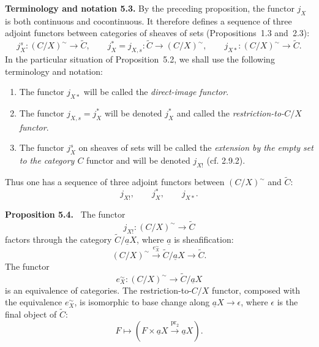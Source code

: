 \documentclass[11pt]{article}
\newcommand{\pr}{\operatorname{pr}}
\newenvironment{statement}[1]{\par\medskip\noindent\textbf{#1.}\ }{\par\medskip}
\begin{document}
\noindent\textbf{Terminology and notation 5.3.}
By the preceding proposition, the functor \(j_X\) is both continuous and cocontinuous. It therefore defines a sequence of three adjoint functors between categories of sheaves of sets (Propositions~1.3 and~2.3):
\[
j_X^s:(C/X)^\sim\longrightarrow\widetilde C,
\qquad
j_X^*=j_{X,s}:\widetilde C\longrightarrow(C/X)^\sim,
\qquad
j_{X*}:(C/X)^\sim\longrightarrow\widetilde C.
\]
In the particular situation of Proposition~5.2, we shall use the following terminology and notation:
\begin{enumerate}[label=\arabic*)]
\item The functor \(j_{X*}\) will be called the \emph{direct-image functor}.
\item The functor \(j_{X,s}=j_X^*\) will be denoted \(j_X^*\) and called the \emph{restriction-to-\(C/X\) functor}.
\item The functor \(j_X^s\) on sheaves of sets will be called the \emph{extension by the empty set to the category \(C\)} functor and will be denoted \(j_{X!}\) (cf. 2.9.2).
\end{enumerate}
Thus one has a sequence of three adjoint functors between \((C/X)^\sim\) and \(\widetilde C\):
\[
j_{X!},\qquad j_X^*,\qquad j_{X*}.
\]

\begin{statement}{Proposition 5.4}
The functor
\[
j_{X!}:(C/X)^\sim\longrightarrow\widetilde C
\]
factors through the category \(\widetilde C/\underline aX\), where \(\underline a\) is sheafification:
\[
(C/X)^\sim\xrightarrow{e_X^\sim}\widetilde C/\underline aX\longrightarrow\widetilde C.
\]
The functor
\[
e_X^\sim:(C/X)^\sim\longrightarrow\widetilde C/\underline aX
\]
is an equivalence of categories. The restriction-to-\(C/X\) functor, composed with the equivalence \(e_X^\sim\), is isomorphic to base change along \(\underline aX\to\epsilon\), where \(\epsilon\) is the final object of \(\widetilde C\):
\[
F\longmapsto(F\times\underline aX\xrightarrow{\pr_2}\underline aX).
\]
\end{statement}
\end{document}
